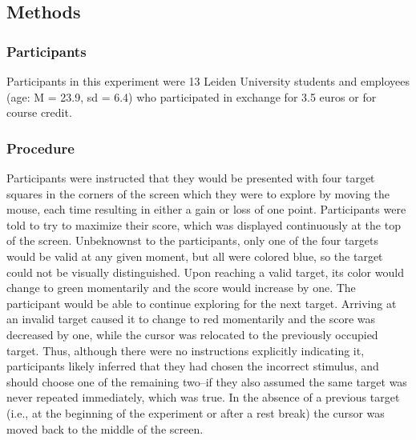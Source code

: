 \documentclass[man,floatsintext]{apa6}
\begin{document}
\subsection{Methods}

\subsubsection{Participants}

Participants in this experiment were 13 Leiden University students and employees (age: M = 23.9, sd = 6.4) who participated in exchange for 3.5 euros or for course credit.

\subsubsection{Procedure}
 
Participants were instructed that they would be presented with four target squares in the corners of the screen which they were to explore by moving the mouse, each time resulting in either a gain or loss of one point. Participants were told to try to maximize their score, which was displayed continuously at the top of the screen. Unbeknownst to the participants, only one of the four targets would be valid at any given moment, but all were colored blue, so the target could not be visually distinguished. Upon reaching a valid target, its color would change to green momentarily and the score would increase by one. The participant would be able to continue exploring for the next target. Arriving at an invalid target caused it to change to red momentarily and the score was decreased by one, while the cursor was relocated to the previously occupied target. Thus, although there were no instructions explicitly indicating it, participants likely inferred that they had chosen the incorrect stimulus, and should choose one of the remaining two--if they also assumed the same target was never repeated immediately, which was true. In the absence of a previous target (i.e., at the beginning of the experiment or after a rest break) the cursor was moved back to the middle of the screen.
\end{document}
